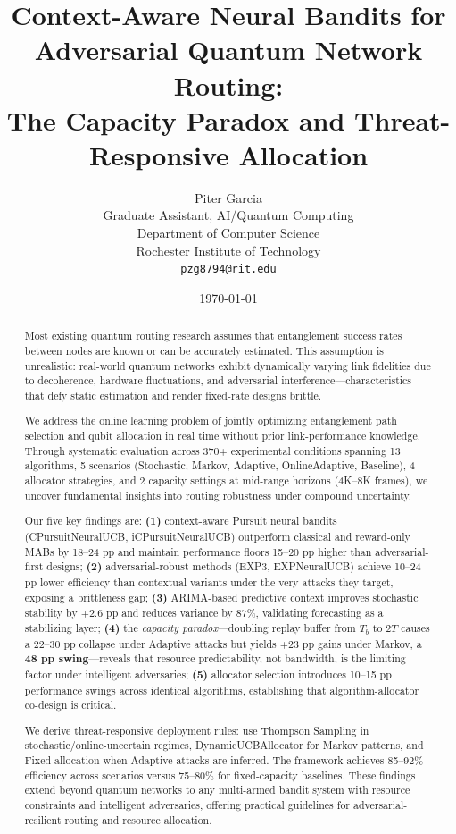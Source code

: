 \documentclass[11pt,a4paper]{article}
\title{Context-Aware Neural Bandits for Adversarial Quantum Network Routing: \\
The Capacity Paradox and Threat-Responsive Allocation}
\author{Piter Garcia\\
Graduate Assistant, AI/Quantum Computing\\
Department of Computer Science\\
Rochester Institute of Technology\\
\texttt{pzg8794@rit.edu}}
\date{\today}
\begin{document}
\maketitle

\begin{abstract}

Most existing quantum routing research assumes that entanglement success rates between nodes are known or can be accurately estimated. This assumption is unrealistic: real-world quantum networks exhibit dynamically varying link fidelities due to decoherence, hardware fluctuations, and adversarial interference—characteristics that defy static estimation and render fixed-rate designs brittle.

We address the online learning problem of jointly optimizing entanglement path selection and qubit allocation in real time without prior link-performance knowledge. Through systematic evaluation across 370+ experimental conditions spanning 13 algorithms, 5 scenarios (Stochastic, Markov, Adaptive, OnlineAdaptive, Baseline), 4 allocator strategies, and 2 capacity settings at mid-range horizons (4K--8K frames), we uncover fundamental insights into routing robustness under compound uncertainty.

Our five key findings are: \textbf{(1)} context-aware Pursuit neural bandits (CPursuitNeuralUCB, iCPursuitNeuralUCB) outperform classical and reward-only MABs by 18--24 pp and maintain performance floors 15--20 pp higher than adversarial-first designs; \textbf{(2)} adversarial-robust methods (EXP3, EXPNeuralUCB) achieve 10--24 pp lower efficiency than contextual variants under the very attacks they target, exposing a brittleness gap; \textbf{(3)} ARIMA-based predictive context improves stochastic stability by +2.6 pp and reduces variance by 87\%, validating forecasting as a stabilizing layer; \textbf{(4)} the \emph{capacity paradox}—doubling replay buffer from $T_b$ to $2T$ causes a 22--30 pp collapse under Adaptive attacks but yields +23 pp gains under Markov, a \textbf{48 pp swing}—reveals that resource predictability, not bandwidth, is the limiting factor under intelligent adversaries; \textbf{(5)} allocator selection introduces 10--15 pp performance swings across identical algorithms, establishing that algorithm-allocator co-design is critical.

We derive threat-responsive deployment rules: use Thompson Sampling in stochastic/online-uncertain regimes, DynamicUCBAllocator for Markov patterns, and Fixed allocation when Adaptive attacks are inferred. The framework achieves 85--92\% efficiency across scenarios versus 75--80\% for fixed-capacity baselines. These findings extend beyond quantum networks to any multi-armed bandit system with resource constraints and intelligent adversaries, offering practical guidelines for adversarial-resilient routing and resource allocation.


\end{abstract}
\end{document}
